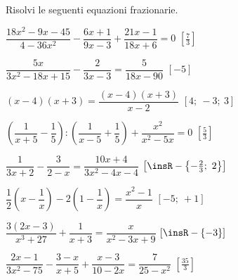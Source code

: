 \begin{esercizio}[\Ast]
\label{ese:20.28}
Risolvi le seguenti equazioni frazionarie.
\begin{enumeratea}
 \item \(\dfrac{18x^{2}-9x-45}{4-36x^{2}}-\dfrac{6x+1}{9x-3}+
        \dfrac{21x-1}{18x+6}=0\) \hfill \(\left[\frac{7}{3}\right]\)
 \item \(\dfrac{5x}{3x^{2}-18x+15}-\dfrac{2}{3x-3}=\dfrac{5}{18x-90}\)
  \hfill \(\left[-5\right]\)
 \item \((x-4)(x+3)=\dfrac{(x-4)(x+3)}{x-2}\)
  \hfill \(\left[4;~-3;~3\right]\)
 \item \(\left(\dfrac{1}{x+5}-\dfrac{1}{5}\right):\left(\dfrac{1}{x-5}+
        \dfrac{1}{5}\right)+\dfrac{x^{2}}{x^{2}-5x}=0\)
  \hfill \(\left[\frac{5}{3}\right]\)
 \item \(\dfrac{1}{3x+2}-\dfrac{3}{2-x}=\dfrac{10x+4}{3x^{2}-4x-4}\)
  \hfill \(\left[\insR-\left\{-{\frac{2}{3}};~2\right\}\right]\)
 \item \(\dfrac{1}{2} \left(x-\dfrac{1}{x}\right)-
        2\left(1-\dfrac{1}{x}\right)=\dfrac{x^{2}-1}{x}\)
  \hfill \(\left[-5;~+1\right]\)
 \item \(\dfrac{3(2x-3)}{x^{3}+27}+\dfrac{1}{x+3}=\dfrac{x}{x^{2}-3x+9}\)
  \hfill \(\left[\insR-\{-3\}\right]\)
 \item \(\dfrac{2x-1}{3x^{2}-75}-\dfrac{3-x}{x+5}+\dfrac{x-3}{10-2x}=
        \dfrac{7}{25-x^{2}}\)
  \hfill \(\left[\frac{35}{3}\right]\)
\end{enumeratea}
\end{esercizio}

